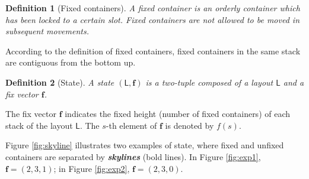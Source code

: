 \documentclass[review,3p,times,12pt,number]{elsarticle}\usepackage{amsmath}\usepackage{amssymb}
\newtheorem{definition}{Definition}
\renewcommand{\emph}[1]{\textbf{\textit{#1}}}
\begin{document}
\begin{definition}[Fixed containers]
A fixed container is an orderly container which has been locked to a certain slot. Fixed containers are not allowed to be moved in subsequent movements.
\end{definition}

According to the definition of fixed containers,  fixed containers in the same stack are contiguous from the bottom up.

\begin{definition}[State]
A state $(\mathsf{L},\boldsymbol{f})$ is a two-tuple composed of a layout $\mathsf{L}$ and a fix vector $\boldsymbol{f}$.
\end{definition}

The fix vector $\boldsymbol{f}$ indicates the fixed height (number of fixed containers) of each stack of the layout $\mathsf{L}$. The $s$-th element of $\boldsymbol{f}$ is denoted by $f(s)$.

Figure \ref{fig:skyline} illustrates two examples of state, where fixed and unfixed containers are separated by \emph{skylines} (bold lines).
In Figure \ref{fig:exp1}, $\boldsymbol f=(2,3,1)$; in Figure \ref{fig:exp2}, $\boldsymbol f=(2,3,0)$.
\end{document}
